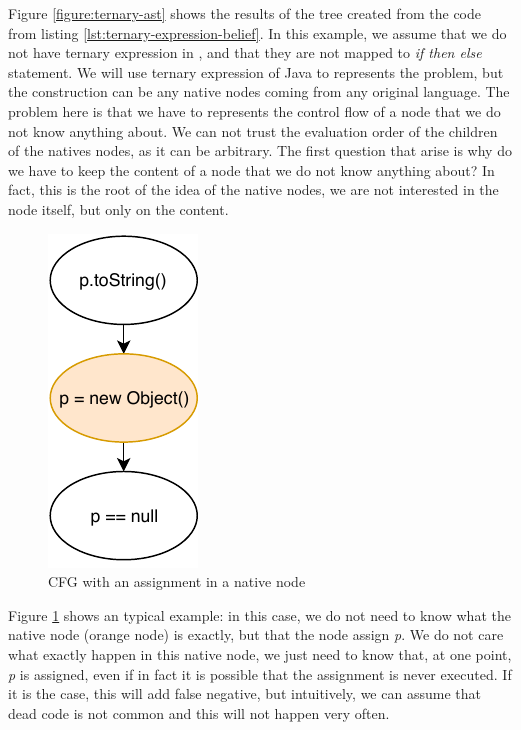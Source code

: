 Figure \ref{figure:ternary-ast} shows the results of the \slang tree created from the code from listing \ref{lst:ternary-expression-belief}. 
In this example, we assume that we do not have ternary expression in \slang, and that they are not mapped to \emph{if then else} statement. 
We will use ternary expression of Java to represents the problem, but the construction can be any native nodes coming from any original language. \newline
The problem here is that we have to represents the control flow of a node that we do not know anything about. 
We can not trust the evaluation order of the children of the natives nodes, as it can be arbitrary. 
The first question that arise is why do we have to keep the content of a node that we do not know anything about? In fact, this is the root of the idea of the native nodes, we are not interested in the node itself, but only on the content. 

\begin{figure}[h]
	\caption{CFG with an assignment in a native node}
	\label{figure:cfg-with-assignment-native}
	\includegraphics[]{figure/cfg-with-assignment-native.pdf}
\end{figure}

Figure \ref{figure:cfg-with-assignment-native} shows an typical example: in this case, we do not need to know what the native node (orange node) is exactly, but that the node assign \emph{p}. We do not care what exactly happen in this native node, we just need to know that, at one point, \emph{p} is assigned, even if in fact it is possible that the assignment is never executed. If it is the case, this will add false negative, but intuitively, we can assume that dead code is not common and this will not happen very often.

